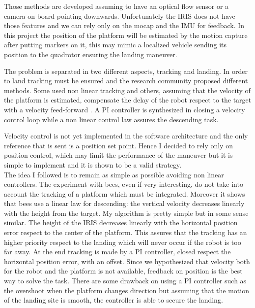 \noindent
Those methods are developed assuming to have an optical flow sensor or a camera on board pointing downwards. Unfortunately the IRIS does not have those features and we can rely only on the mocap and the IMU for feedback. 
In this project the position of the platform will be estimated by the motion capture after putting markers on it, this may mimic a localized vehicle sending its position to the quadrotor ensuring the landing maneuver. \par The problem is separated in two different aspects, tracking and landing. In order to land tracking must be ensured and the research community proposed different methods. Some used non linear tracking \cite{Holger2008} and others, assuming that the velocity of the platform is estimated, compensate the delay of the robot respect to the target with a velocity feed-forward \cite{Friis2009}. A PI controller is synthesized in \cite{Herisse2010} closing a velocity control loop while a non linear control law assures the descending task. \par
Velocity control is not yet implemented in the software architecture and the only reference that is sent is a position set point. Hence I decided to rely only on position control, which may limit the performance of the maneuver but it is simple to implement and it is shown to be a valid strategy. \\
\noindent
The idea I followed is to remain as simple as possible avoiding non linear controllers. The experiment with bees, even if very interesting, do not take into account the tracking of a platform which must be integrated. Moreover it shows that bees use a linear law for descending: the vertical velocity decreases linearly with the height from the target. My algorithm is pretty simple but in some sense similar. The height of the IRIS decreases linearly with the horizontal position error respect to the center of the platform. This assures that the tracking has an higher priority respect to the landing which will never occur if the robot is too far away. At the end tracking is made by a PI controller, closed respect the horizontal position error, with an offset. Since we hypothesized that velocity both for the robot and the platform is not available, feedback on position is the best way to solve the task. There are some drawback on using a PI controller such as the overshoot when the platform changes direction but assuming that the motion of the landing site is smooth, the controller is able to secure the landing. 




























